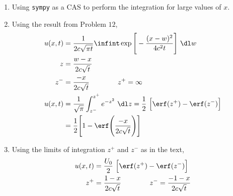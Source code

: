 \begin{enumerate}
    \item Using \texttt{sympy} as a CAS to perform the integration for large values of
          $ x $.

          \begin{figure}[H]
              \centering
              \anitablesix
          \end{figure}

    \item Using the result from Problem $ 12 $,
          \begin{align}
              u(x, t) & = \frac{1}{2c\sqrt{\pi t}} \infint \exp\Bigg[
              -\frac{(x - w)^2}{4c^2 t} \Bigg]\ \dl w                              \\
              z       & = \frac{w - x}{2c\sqrt{t}}                                 \\
              z^-     & = \frac{-x}{2c\sqrt{t}} \qquad\qquad
              z^+ = \infty                                                         \\
              u(x, t) & = \frac{1}{\sqrt{\pi}} \int_{z^-}^{z^+} e^{-z^2}\ \dl z
              = \frac{1}{2}\ \Big[ \erf(z^+) - \erf(z^-) \Big]                     \\
                      & = \frac{1}{2} \Bigg[ 1 - \erf \Bigg( \frac{-x}{2c\sqrt{t}}
                  \Bigg) \Bigg]
          \end{align}

    \item Using the limits of integration $ z^+ $ and $ z^- $ as in the text,
          \begin{align}
              u(x, t) & = \frac{U_0}{2}\ \Big[ \erf(z^+) - \erf(z^-) \Big] \\
              z^+     & = \frac{1-x}{2c\sqrt{t}} \qquad\qquad
              z^- = \frac{-1-x}{2c\sqrt{t}}
          \end{align}


\end{enumerate}
